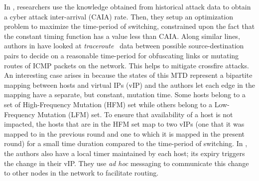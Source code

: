 In , researchers use the knowledge obtained from historical attack data to obtain a cyber attack inter-arrival (CAIA) rate. Then, they setup an optimization problem to maximize the time-period of switching, constrained upon the fact that the constant timing function has a value less than CAIA. Along similar lines, authors in  have looked at \emph{traceroute}~ data between possible source-destination pairs to decide on a reasonable time-period for obfuscating links or mutating routes of ICMP packets on the network. This helps to mitigate crossfire attacks.
An interesting case arises in  because the states of this MTD represent a bipartite mapping between hosts and virtual IPs (vIP) and the authors let each edge in the mapping have a separate, but constant, mutation time. Some hosts belong to a set of High-Frequency Mutation (HFM) set while others belong to a Low-Frequency Mutation (LFM) set. To ensure that availability of a host is not impacted, the hosts that are in the HFM set map to two vIPs (one that it was mapped to in the previous round and one to which it is mapped in the present round) for a small time duration compared to the time-period of switching. In , the authors also have a local timer maintained by each host; its expiry triggers the change in their vIP. They use {\em ad hoc} messaging to communicate this change to other nodes in the network to facilitate routing.

